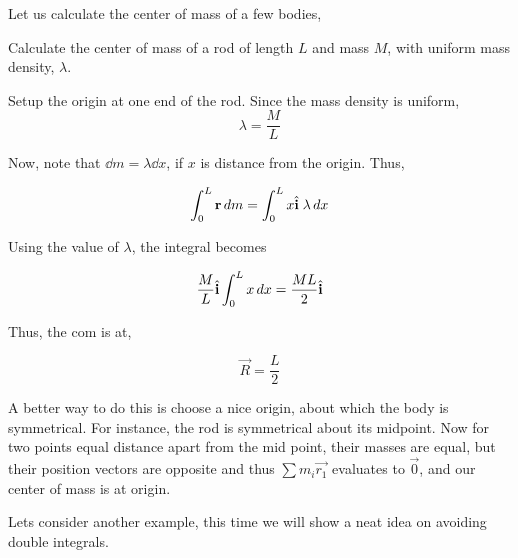 Let us calculate the center of mass of a few bodies, 

\begin{example}
    Calculate the center of mass of a rod of length \(L\) and mass \(M\), with uniform mass density, \(\lambda\).

    \begin{soln}
        Setup the origin at one end of the rod. Since the mass density is uniform, 
        \begin{equation*}
            \lambda = \frac{M}{L}
        \end{equation*}

        Now, note that \(\dd{m} = \lambda \dd{x}\), if \(x\) is distance from the origin. Thus,

        \begin{equation*}
            \int_{0}^{L} \boldsymbol{\mathbf{r}} \mathop{}\!{d}{m} = \int_{0}^{L} x\hat{\boldsymbol{\mathbf{i}}}\;\lambda \mathop{}\!{d}{x}
        \end{equation*}

        Using the value of \(\lambda\), the integral becomes

        \begin{equation*}
            \frac{M}{L} \hat{\boldsymbol{\mathbf{i}}} \int_{0}^{L} x \mathop{}\!{d}{x} = \frac{ML}{2} \hat{\boldsymbol{\mathbf{i}}} 
        \end{equation*}

        Thus, the com is at, 

        \begin{equation}
            \vec{R} = \frac{L}{2}
        \end{equation}

    \end{soln}
\end{example}

A better way to do this is choose a nice origin, about which the body is symmetrical. For instance, 
the rod is symmetrical about its midpoint. Now for two points equal distance apart from the mid point,
their masses are equal, but their position vectors are opposite and thus \(\sum m_i\vec{r_1}\) evaluates 
to \(\vec{0}\), and our center of mass is at origin.

Lets consider another example, this time we will show a neat idea on avoiding double 
integrals.


\begin{marginfigure}
    \centering
\end{marginfigure}

